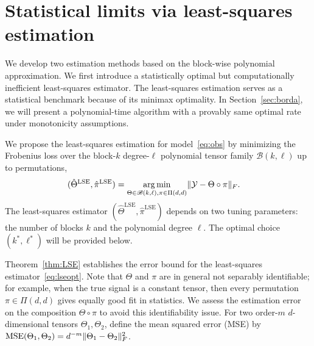 \documentclass[12pt]{article}
\theoremstyle{definition}
\def\caliB{\mathscr{B}}
\begin{document}
\section{\color{blue}Statistical limits via least-squares estimation}\label{sec:lse}
We develop two estimation methods based on the block-wise polynomial approximation. We first introduce a statistically optimal but computationally inefficient least-squares estimator. The least-squares estimation serves as a statistical benchmark because of its minimax optimality. 
In Section~\ref{sec:borda}, we will present a polynomial-time algorithm with a provably same optimal rate under monotonicity assumptions.

We propose the least-squares estimation for model~\eqref{eq:obs} by minimizing the Frobenius loss over the block-$k$ degree-$\ell$ polynomial tensor family $\caliB(k,\ell)$ up to permutations, 
\begin{align}\label{eq:lseopt}
    (\hat\Theta^{\text{LSE}},\hat \pi^{\text{LSE}}) &= \argmin_{\Theta\in\caliB(k,\ell), \pi\in \Pi(d,d)}\FnormSize{}{\tY-\Theta\circ\pi}.
\end{align}
The least-squares estimator $(\hat\Theta^{\text{LSE}},\hat\pi^{\text{LSE}})$ depends on two tuning parameters: the number of blocks $k$ and the polynomial degree $\ell$. The optimal choice $(k^*,\ell^*)$ will be provided below. 

Theorem~\ref{thm:LSE} establishes the error bound for the least-squares estimator~\eqref{eq:lseopt}. Note that $\Theta$ and $\pi$ are in general not separably identifiable; for example, when the true signal is a constant tensor, then every permutation $\pi\in \Pi(d,d)$ gives equally good fit in statistics. We assess the estimation error on the composition $\Theta \circ \pi$ to avoid this identifiability issue. For two order-$m$ $d$-dimensional tensors $\Theta_1, \Theta_2$, define the mean squared error (MSE) by $\textup{MSE}(\Theta_1,\Theta_2) = d^{-m}\lVert\Theta_1-\Theta_2\rVert_F^2$. 
 
\end{document}

